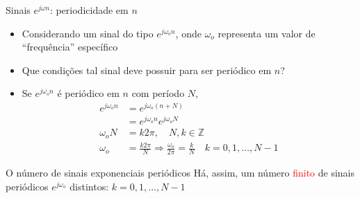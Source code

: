 \begin{slide}{Sinais $e^{j\omega n}$: periodicidade em $n$ }
   \begin{itemize}
    \item <1-3> Considerando um sinal do tipo $e^{j\omega_o n}$, onde $\omega_o$ representa um valor de ``frequência'' específico
     \item <2-3> Que condições tal sinal deve possuir para ser periódico em $n$?
     \item <3-3> Se $e^{j\omega_o n}$ é periódico em $n$ com período $N$,
        \begin{align*}
           e^{j\omega_o n} &= e^{j\omega_o (n+N)}\\
                           &= e^{j\omega_o n} e^{j\omega_o N}\\
             \omega_o N &= k2\pi, \quad N, k \in \mathbb{Z}\\
               \omega_o &= \frac{k2\pi}{N} \Rightarrow \frac{\omega_o}{2\pi} = \frac{k}{N}\quad k=0,1,\ldots, N-1
         \end{align*}%
\end{itemize}
\end{slide} 

\begin{note}{O número de sinais exponenciais periódicos}
   Há, assim, um número \textcolor{red}{finito} de sinais periódicos $e^{j\omega_o}$ distintos: $k=0,1,\ldots, N-1$
\end{note}


